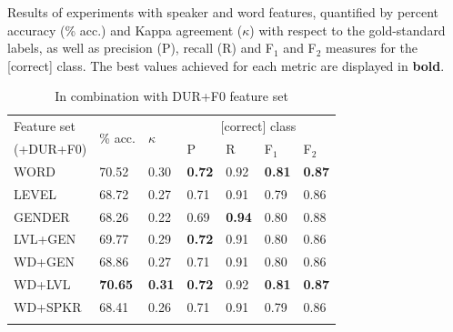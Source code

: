		
		
		\begin{table}[tb]
			\centering
			\caption[Results of experiments with speaker and word features]{Results of experiments with speaker and word features,
			quantified by percent accuracy (\% acc.) and Kappa agreement ($\kappa$) with respect to the gold-standard labels, as well as precision (P), recall (R) and F$_1$ and F$_2$ measures for the [correct] class. 
			The best values achieved for each metric are displayed in \textbf{bold}.
			}
			
					\begin{subtable}{\textwidth}
			\centering
			\caption{In combination with DUR+F0 feature set}
			\begin{tabularx}{.8\textwidth}{lXXXXXX}		
			\toprule
			Feature set & \multirow{2}{*}{\% acc.} & \multirow{2}{*}{$\kappa$} & \multicolumn{4}{c}{[correct] class} \\
			 \cmidrule(lr){4-7}
			(+DUR+F0)& & & P & R & F$_1$ & F$_2$ \\
			\midrule
WORD		&	70.52	&	0.30	&	\textbf{0.72}	&	0.92	&	\textbf{0.81}	&	\textbf{0.87}	\\
LEVEL		&	68.72	&	0.27	&	0.71	&	0.91	&	0.79	&	0.86	\\
GENDER	&	68.26	&	0.22	&	0.69	&	\textbf{0.94}	&	0.80	&	0.88	\\
\addlinespace											
LVL+GEN	&	69.77	&	0.29	&	\textbf{0.72}	&	0.91	&	0.80	&	0.86	\\
WD+GEN	&	68.86	&	0.27	&	0.71	&	0.91	&	0.80	&	0.86	\\
WD+LVL	&	\textbf{70.65}	&	\textbf{0.31}	&	\textbf{0.72}	&	0.92	&	\textbf{0.81}	&	\textbf{0.87}	\\
\addlinespace											
WD+SPKR	&	68.41	&	0.26	&	0.71	&	0.91	&	0.79	&	0.86	\\
			\bottomrule
			\label{tab:results:spkrword:durF0}
			\end{tabularx}
		\end{subtable}
			

\end{table}
